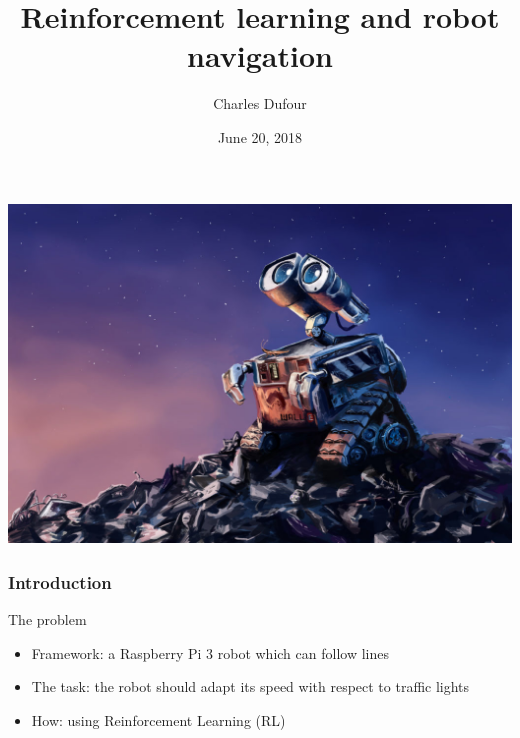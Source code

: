 \documentclass[dvipsnames,svgnames]{beamer}
\author{Charles Dufour}
\title{Reinforcement learning and robot navigation }
\institute{Supervisors: Prof. F. Eisenbrand, Jonas Racine}
\date{June 20, 2018}
\begin{document}
\begin{frame}
\titlepage
\centering
\includegraphics[scale=1]{img/Wall-E.jpg}
\end{frame}




\begin{frame}
\frametitle{Introduction}
\begin{block}{The problem}

  \begin{itemize}
   \item Framework: a Raspberry Pi 3 robot which can follow lines
   \item The task: the robot should adapt its speed with respect to traffic lights
   \item How: using Reinforcement Learning (RL) 
  \end{itemize}
\end{block} 
\end{frame}
\end{document}

